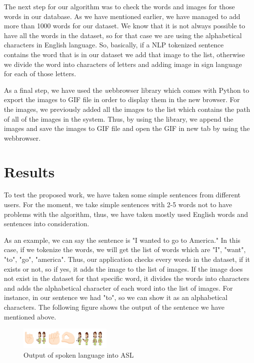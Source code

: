 \documentclass[twocolumn,10pt]{asme2ej}
\begin{document}
The next step for our algorithm was to check the words and images for those words in our database. As we have mentioned earlier, we have managed to add more than 1000 words for our dataset. We know that it is not always possible to have all the words in the dataset, so for that case we are using the alphabetical characters in English language. So, basically, if a NLP tokenized sentence contains the word that is in our dataset we add that image to the list, otherwise we divide the word into characters of letters and adding image in sign language for each of those letters. 

As a final step, we have used the {\emph webbrowser} library which comes with Python to export the images to GIF file in order to display them in the new browser. For the images, we previously added all the images to the list which contains the path of all of the images in the system. Thus, by using the library, we append the images and save the images to GIF file and open the GIF in new tab by using the webbrowser. 

\section{Results}
To test the proposed work, we have taken some simple sentences from different users. For the moment, we take simple sentences with 2-5 words not to have problems with the algorithm, thus, we have taken mostly used English words and sentences into consideration.

As an example, we can say the sentence is "I wanted to go to America." In this case, if we tokenize the words, we will get the list of words which are "I", "want", "to", "go", "america". Thus, our application checks every words in the dataset, if it exists or not, so if yes, it adds the image to the list of images. If the image does not exist in the dataset for that specific word, it divides the words into characters and adds the alphabetical character of each word into the list of images. For instance, in our sentence we had "to", so we can show it as an alphabetical characters. The following figure shows the output of the sentence we have mentioned above. 

\begin{figure}[h]
    \centering
    \includegraphics[width=0.4\textwidth]{figure/Untitled.png}
    \caption{Output of spoken language into ASL}
    \label{fig:mesh1}
\end{figure}
\end{document}
